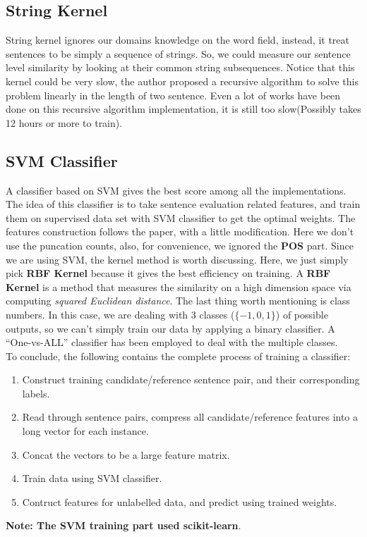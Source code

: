 \documentclass[11pt]{article}
\begin{document}
\subsection{String Kernel} %
\label{sub:string_kernel}
String kernel\cite{ssk} ignores our domains knowledge on the word field, instead, it treat sentences to be simply a sequence of strings. So, we could measure our sentence level similarity by looking at their common string subsequences. Notice that this kernel could be very slow, the author proposed a recursive algorithm to solve this problem linearly in the length of two sentence. Even a lot of works have been done on this recursive algorithm implementation, it is still too slow(Possibly takes 12 hours or more to train).

\subsection{SVM Classifier} %
\label{sub:svm_classifier}
A classifier\cite{svm} based on SVM gives the best score among all the implementations.\\
The idea of this classifier is to take sentence evaluation related features, and train them on supervised data set with SVM classifier to get the optimal weights. The features construction follows the paper, with a little modification. Here we don't use the puncation counts, also, for convenience, we ignored the \textbf{POS} part.
Since we are using SVM, the kernel method is worth discussing. Here, we just simply pick \textbf{RBF Kernel} because it gives the best efficiency on training.
A \textbf{RBF Kernel} is a method that measures the similarity on a high dimension space via computing \textit{squared Euclidean distance}. The last thing worth mentioning is class numbers. In this case, we are dealing with 3 classes ($\{-1,0,1\}$) of possible outputs, so we can't simply train our data by applying a binary classifier. A ``One-vs-ALL'' classifier has been employed to deal with the multiple classes.\\
To conclude, the following contains the complete process of training a classifier:
\begin{enumerate}
	\item Construct training candidate/reference sentence pair, and their corresponding labels.
	\item Read through sentence pairs, compress all candidate/reference features into a long vector for each instance.
	\item Concat the vectors to be a large feature matrix.
	\item Train data using SVM classifier.
	\item Contruct features for unlabelled data, and predict using trained weights.
\end{enumerate}
\textbf{Note: The SVM training part used scikit-learn}\cite{scilearn}.
\end{document}
